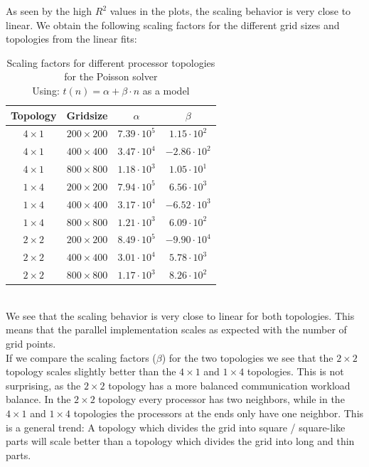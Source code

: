As seen by the high $R^2$ values in the plots, the scaling behavior is very close to linear. 
We obtain the following scaling factors for the different grid sizes and topologies from the linear fits:
\begin{table}[H]
    \centering
    \begin{tabular}{|c|c|c|c|}
        \hline
        Topology & Gridsize & $\alpha$ & $\beta$ \\\hline
        $4\times 1$ & $200\times 200$ & $7.39\cdot 10^5$ & $1.15 \cdot 10^2$ \\ \hline
        $4\times 1$ & $400\times 400$ & $3.47\cdot 10^4$ & $-2.86\cdot 10^2$ \\ \hline
        $4\times 1$ & $800\times 800$ & $1.18\cdot 10^3$ & $1.05 \cdot 10^1$ \\ \hline
        $1\times 4$ & $200\times 200$ & $7.94\cdot 10^5$ & $6.56 \cdot 10^3$ \\ \hline
        $1\times 4$ & $400\times 400$ & $3.17\cdot 10^4$ & $-6.52\cdot 10^3$ \\ \hline
        $1\times 4$ & $800\times 800$ & $1.21\cdot 10^3$ & $6.09 \cdot 10^2$ \\ \hline
        $2\times 2$ & $200\times 200$ & $8.49\cdot 10^5$ & $-9.90\cdot 10^4$ \\ \hline
        $2\times 2$ & $400\times 400$ & $3.01\cdot 10^4$ & $5.78 \cdot 10^3$ \\ \hline
        $2\times 2$ & $800\times 800$ & $1.17\cdot 10^3$ & $8.26 \cdot 10^2$ \\ \hline
    \end{tabular}
    \caption{Scaling factors for different processor topologies for the Poisson solver\\Using: $t(n) = \alpha + \beta \cdot n$ as a model}
\end{table}
\\
We see that the scaling behavior is very close to linear for both topologies. This means that the parallel implementation scales as expected with the number of grid points.\\
If we compare the scaling factors ($\beta$) for the two topologies we see that the $2\times 2$ topology scales slightly better than the $4\times 1$ and $1\times 4$ topologies. This is not surprising, as the $2\times 2$ topology has a more balanced communication workload balance. In the $2\times 2$ topology every processor has two neighbors, while in the $4\times 1$ and $1\times 4$ topologies the processors at the ends only have one neighbor. This is a general trend: A topology which divides the grid into square / square-like parts will scale better than a topology which divides the grid into long and thin parts.\\
